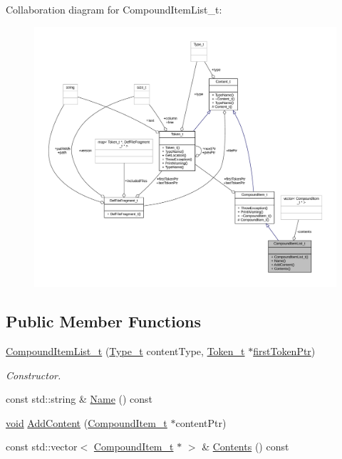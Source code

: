 Collaboration diagram for Compound\+Item\+List\+\_\+t\+:
\nopagebreak
\begin{figure}[H]
\begin{center}
\leavevmode
\includegraphics[width=350pt]{struct_compound_item_list__t__coll__graph}
\end{center}
\end{figure}
\subsection*{Public Member Functions}
\begin{DoxyCompactItemize}
\item 
\hyperlink{struct_compound_item_list__t_aa11b5ce1861d50aa4cd43004c6f59141}{Compound\+Item\+List\+\_\+t} (\hyperlink{struct_content__t_a9ba94026278eb679d8d42d28725b0eae}{Type\+\_\+t} content\+Type, \hyperlink{struct_token__t}{Token\+\_\+t} $\ast$\hyperlink{struct_compound_item__t_a4d95dc788120f627e332491589d20c5c}{first\+Token\+Ptr})
\begin{DoxyCompactList}\small\item\em Constructor. \end{DoxyCompactList}\item 
const std\+::string \& \hyperlink{struct_compound_item_list__t_ab3b0fdd4785891a132a476aea086692e}{Name} () const 
\item 
\hyperlink{_t_e_m_p_l_a_t_e__cdef_8h_ac9c84fa68bbad002983e35ce3663c686}{void} \hyperlink{struct_compound_item_list__t_a8dd9e44d584a7b3586304adcda985810}{Add\+Content} (\hyperlink{struct_compound_item__t}{Compound\+Item\+\_\+t} $\ast$content\+Ptr)
\item 
const std\+::vector$<$ \hyperlink{struct_compound_item__t}{Compound\+Item\+\_\+t} $\ast$ $>$ \& \hyperlink{struct_compound_item_list__t_a68a63cc1795310eafef74850fb9d7214}{Contents} () const 
\end{DoxyCompactItemize}
